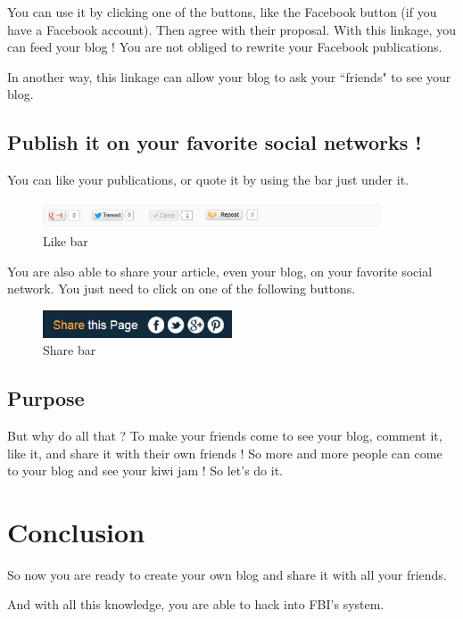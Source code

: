 \documentclass[a4paper,10pt]{article}
\begin{document}
You can use it by clicking one of the buttons, like the Facebook button (if you have a Facebook account). Then agree with their proposal. With this linkage, you can feed your blog ! You are not obliged to rewrite your Facebook publications.

In another way, this linkage can allow your blog to ask your ``friends" to see your blog.

\subsection{Publish it on your favorite social networks !}

You can like your publications, or quote it by using the bar just under it.

\begin{figure}[h]
    \center
  \includegraphics[width=0.9\textwidth]{Images/articleBar.png}
    \caption{Like bar}
\end{figure}

You are also able to share your article, even your blog, on your favorite social network. You just need to click on one of the following buttons.

\begin{figure}[h]
    \center
  \includegraphics[width=0.5\textwidth]{Images/blogBar.png}
    \caption{Share bar}
\end{figure}

\subsection{Purpose}
But why do all that ? To make your friends come to see your blog, comment it, like it, and share it with their own friends ! So more and more people can come to your blog and see your kiwi jam ! So let's do it.

\newpage
\section{Conclusion}
So now you are ready to create your own blog and share it with all your friends.

And with all this knowledge, you are able to hack into FBI's system.
\end{document}

